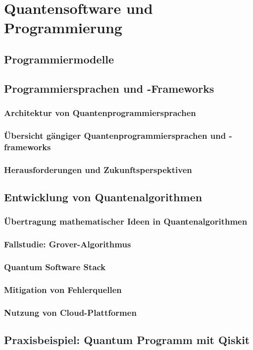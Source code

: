 \chapter{Quantensoftware und Programmierung}
\label{programming} %



\section{Programmiermodelle}

\section{Programmiersprachen und -Frameworks}
\subsection{Architektur von Quantenprogrammiersprachen}
\subsection{Übersicht gängiger Quantenprogrammiersprachen und -frameworks}
\subsection{Herausforderungen und Zukunftsperspektiven}

\section{Entwicklung von Quantenalgorithmen}

\subsection{Übertragung mathematischer Ideen in Quantenalgorithmen}

\subsection{Fallstudie: Grover-Algorithmus}

\subsection{Quantum Software Stack}

\subsection{Mitigation von Fehlerquellen}

\subsection{Nutzung von Cloud-Plattformen}

\section{Praxisbeispiel: Quantum Programm mit Qiskit}


\printbibliography
